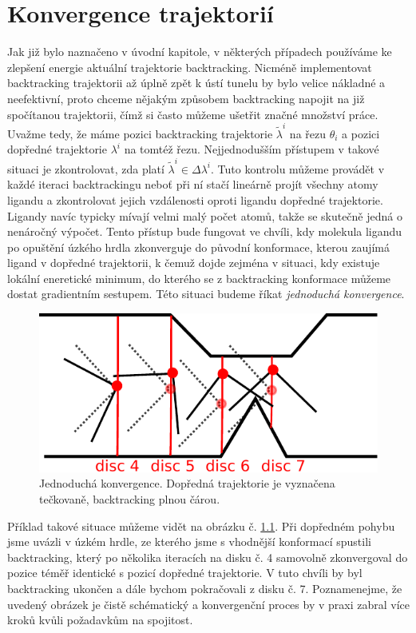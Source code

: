 \chapter{Konvergence trajektorií}
Jak již bylo naznačeno v úvodní kapitole, v některých případech používáme ke
zlepšení energie aktuální trajektorie backtracking. Nicméně implementovat
backtracking trajektorii až úplně zpět k ústí tunelu by bylo velice nákladné
a neefektivní, proto chceme nějakým způsobem backtracking napojit na již
spočítanou trajektorii, čímž si často můžeme ušetřit značné množství práce.
Uvažme tedy, že máme pozici backtracking trajektorie $ \tilde{\lambda}^i $
na řezu $ \theta_i $ a pozici dopředné trajektorie $ \lambda^i $ na tomtéž řezu.
Nejjednodušším přístupem v takové situaci je zkontrolovat, zda platí
$ \tilde{\lambda}^i \in \Delta \lambda^i $. Tuto kontrolu můžeme provádět v každé
iteraci backtrackingu neboť při ní stačí lineárně projít všechny atomy ligandu
a zkontrolovat jejich vzdálenosti oproti ligandu dopředné trajektorie. Ligandy
navíc typicky mívají velmi malý počet atomů, takže se skutečně jedná o nenáročný
výpočet. Tento přístup bude fungovat ve chvíli, kdy molekula ligandu po opuštění
úzkého hrdla zkonverguje do původní konformace, kterou zaujímá ligand v dopředné
trajektorii, k čemuž dojde zejména v situaci, kdy existuje lokální eneretické
minimum, do kterého se z backtracking konformace můžeme dostat gradientním sestupem.
Této situaci budeme říkat \textit{jednoduchá konvergence}.

\begin{figure}[ht]
\centering
\includegraphics[width=.5\hsize]{img/backtracking_simple.pdf}
\caption{Jednoduchá konvergence. Dopředná trajektorie je vyznačena tečkovaně,
backtracking plnou čárou.
}
\label{fig:simple_convergence}
\end{figure}


Příklad takové situace můžeme vidět na obrázku č. \ref{fig:simple_convergence}.
Při dopředném pohybu jsme uvázli v úzkém hrdle, ze kterého jsme s vhodnější
konformací spustili backtracking, který po několika iteracích na disku č. 4
samovolně zkonvergoval do pozice téměř identické s pozicí dopředné trajektorie.
V tuto chvíli by byl backtracking ukončen a dále bychom pokračovali z disku č. 7.
Poznamenejme, že uvedený obrázek je čistě schématický a konvergenční proces
by v praxi zabral více kroků kvůli požadavkům na spojitost.

